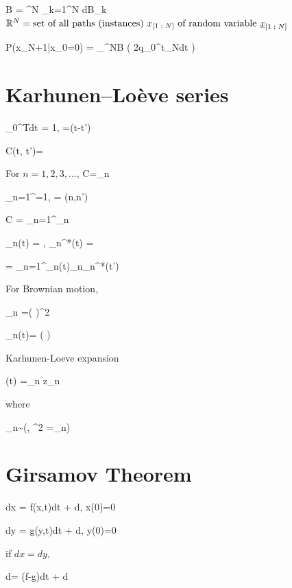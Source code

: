 \beq
\cald B = \gamma^N \prod_{k=1}^N dB_k
\eeq
${ \mathbb{R}}^N=
\text{set of all paths (instances) $x_{[1\;;\; N]}$ of random variable
${\underline{x}}_{[1\;;\; N]}$ }
$


\beq
P(x_{N+1}|x_0=0)  =
\int_{\RR^{N}}\cald B\;
\exp\left(
{2q}\int_0^{t_N}dt
\right)
\eeq

\section{Karhunen–Loève series}

\beq
\int_0^{T}dt\; = 1,
\;
=\delta(t-t')
\eeq

\beq
C(t, t')= 
\eeq


For $n=1,2,3,\ldots$, 
\beq
C=\lam_n
\eeq

\beq
\sum_{n=1}^\infty {}=1,
\;
=
\delta(n,n')
\eeq



\beq
C = \sum_{n=1}^\infty {}\lam_n
\eeq



\beq
\phi_n(t) = ,
\;
\phi_n^*(t) = 
\eeq

\beq
{} = \sum_{n=1}^\infty \phi_n(t)\lam_n\phi_n^*(t')
\eeq


For Brownian motion,

\beq
\lam_n  =\left(
\right)^2
\eeq

\beq
\phi_n(t)=
\sin \left(
\right)
\eeq


Karhunen-Loeve expansion

\beq
\rvB(t) =\sum_n z_n
\eeq

where

\beq
\lam_n\sim \caln(, \s^2 =\lam_n)
\eeq


\section{Girsamov Theorem}
\beq
dx = f(x,t)dt + d\rvB, \quad x(0)=0
\eeq

\beq
dy = g(y,t)dt + d\rvbeta, \quad y(0)=0
\eeq

\begin{claim}
if $dx=dy$,

\beq
d\rvbeta =
(f-g)dt + d\rvB
\eeq

\end{claim}
\proof

